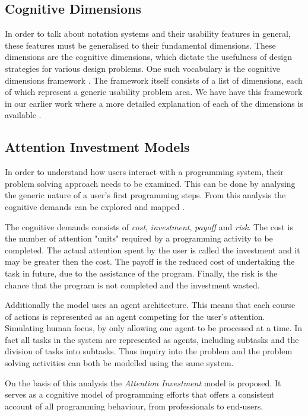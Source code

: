 \subsection{Cognitive Dimensions}
In order to talk about notation systems and their usability features in general, these features must be generalised to their fundamental dimensions. These dimensions are the cognitive dimensions, which dictate the usefulness of design strategies for various design problems. One such vocabulary is the cognitive dimensions framework \cite{green1996usability}. The framework itself consists of a list of dimensions, each of which represent a generic usability problem area.
We have have this framework in our earlier work where a more detailed explanation of each of the dimensions is available \cite{p92018gameplay}.

\subsection{Attention Investment Models}
In order to understand how users interact with a programming system, their problem solving approach needs to be examined. This can be done by analysing the generic nature of a user's first programming steps. From this analysis the  cognitive  demands can be explored and mapped \cite{blackwell2002first}.

The cognitive demands consists of \textit{cost}, \textit{investment}, \textit{payoff} and \textit{risk}. The cost is the number of attention "units" required by a programming activity to be completed. The actual attention spent by the user is called the investment and it may be greater then the cost. The payoff is the reduced cost of undertaking the task in future, due to the assistance of the program. Finally, the risk is the chance that the program is not completed and the investment wasted.

Additionally the model uses an agent architecture. This means that each course of actions is represented as an agent competing for the user's attention. Simulating human focus, by only allowing one agent to be processed at a time. In fact all tasks in the system are represented as agents, including subtasks and the division of tasks into subtasks. Thus inquiry into the problem and the problem solving activities can both be modelled using the same system.

On  the  basis  of  this  analysis  the  \textit{Attention Investment} model is proposed. It serves as a cognitive model of programming efforts that offers a consistent account of all programming behaviour, from professionals to end-users.

